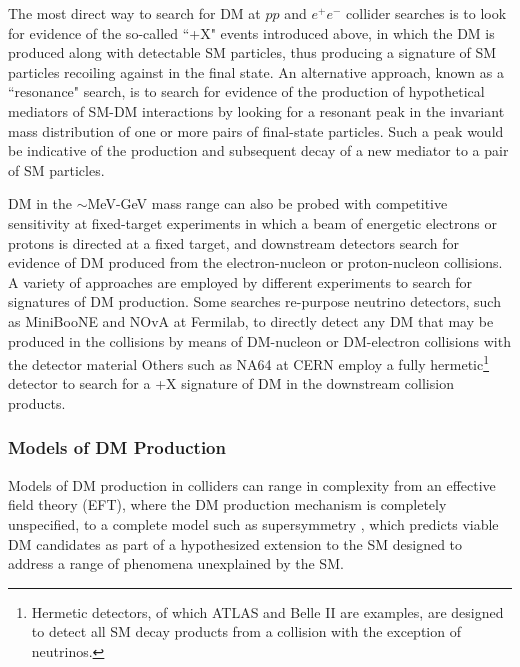 The most direct way to search for DM at \(pp\) and \(e^+e^-\) collider searches is to look for evidence of the so-called ``\met+X" events introduced above, in which the DM is produced along with detectable SM particles, thus producing a signature of SM particles recoiling against \met in the final state. An alternative approach, known as a ``resonance" search, is to search for evidence of the production of hypothetical mediators of SM-DM interactions by looking for a resonant peak in the invariant mass distribution of one or more pairs of final-state particles. Such a peak would be indicative of the production and subsequent decay of a new mediator to a pair of SM particles.

DM in the \(\sim\)MeV-GeV mass range can also be probed with competitive sensitivity at fixed-target experiments in which a beam of energetic electrons or protons is directed at a fixed target, and downstream detectors search for evidence of DM produced from the electron-nucleon or proton-nucleon collisions. A variety of approaches are employed by different experiments to search for signatures of DM production. Some searches re-purpose neutrino detectors, such as MiniBooNE \cite{miniboone_2018} and NOvA \cite{nova_2017} at Fermilab, to directly detect any DM that may be produced in the collisions by means of DM-nucleon or DM-electron collisions with the detector material
Others such as NA64 \cite{na64_2019} at CERN employ a fully hermetic\footnote{Hermetic detectors, of which ATLAS and Belle II are examples, are designed to detect all SM decay products from a collision with the exception of neutrinos.} detector to search for a \met+X signature of DM in the downstream collision products.

\subsubsection{Models of DM Production}

Models of DM production in colliders can range in complexity from an effective field theory (EFT), where the DM production mechanism is completely unspecified, to a complete model such as supersymmetry \cite{susy_dm}, which predicts viable DM candidates as part of a hypothesized extension to the SM designed to address a range of phenomena unexplained by the SM. 

